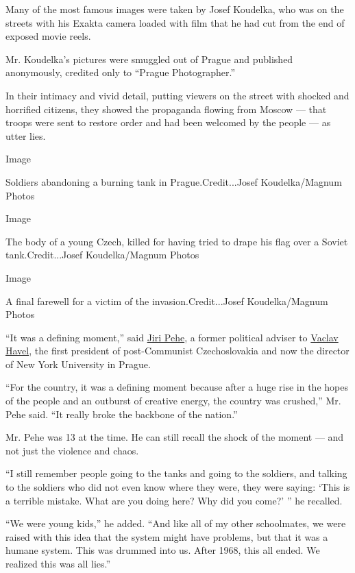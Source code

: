 Many of the most famous images were taken by Josef Koudelka, who was on
the streets with his Exakta camera loaded with film that he had cut from
the end of exposed movie reels.

Mr. Koudelka's pictures were smuggled out of Prague and published
anonymously, credited only to ``Prague Photographer.''

In their intimacy and vivid detail, putting viewers on the street with
shocked and horrified citizens, they showed the propaganda flowing from
Moscow --- that troops were sent to restore order and had been welcomed
by the people --- as utter lies.

Image

Soldiers abandoning a burning tank in Prague.Credit...Josef
Koudelka/Magnum Photos

Image

The body of a young Czech, killed for having tried to drape his flag
over a Soviet tank.Credit...Josef Koudelka/Magnum Photos

Image

A final farewell for a victim of the invasion.Credit...Josef
Koudelka/Magnum Photos

``It was a defining moment,'' said
\href{https://www.nytimes.com/2008/08/24/opinion/24pehe.html}{Jiri
Pehe}, a former political adviser to
\href{https://www.nytimes.com/2011/12/19/world/europe/vaclav-havel-dissident-playwright-who-led-czechoslovakia-dead-at-75.html}{Vaclav
Havel}, the first president of post-Communist Czechoslovakia and now the
director of New York University in Prague.

``For the country, it was a defining moment because after a huge rise in
the hopes of the people and an outburst of creative energy, the country
was crushed,'' Mr. Pehe said. ``It really broke the backbone of the
nation.''

Mr. Pehe was 13 at the time. He can still recall the shock of the moment
--- and not just the violence and chaos.

``I still remember people going to the tanks and going to the soldiers,
and talking to the soldiers who did not even know where they were, they
were saying: `This is a terrible mistake. What are you doing here? Why
did you come?' '' he recalled.

``We were young kids,'' he added. ``And like all of my other
schoolmates, we were raised with this idea that the system might have
problems, but that it was a humane system. This was drummed into us.
After 1968, this all ended. We realized this was all lies.''

